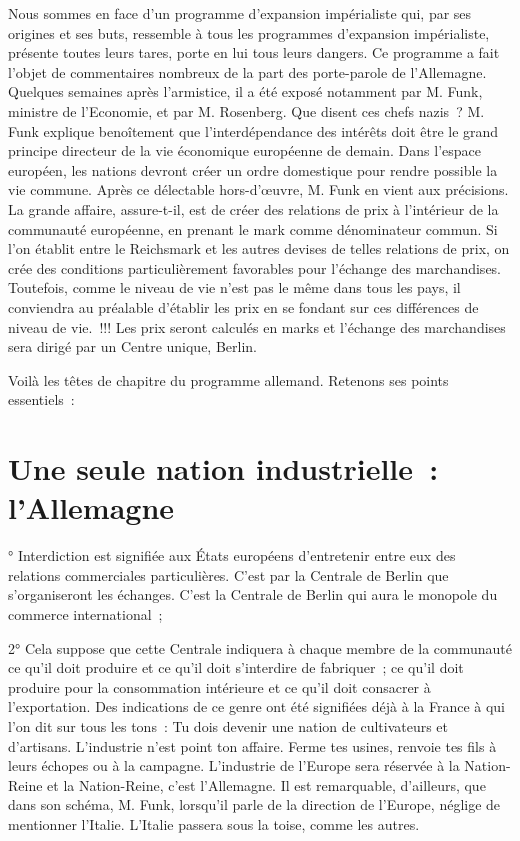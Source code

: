 \documentclass[french,twoside]{book} %
\begin{document}
Nous sommes en face d’un programme d’expansion impérialiste qui, par ses origines et ses buts, ressemble à tous les programmes d’expansion impérialiste, présente toutes leurs tares, porte en lui tous leurs dangers. Ce programme a fait l’objet de commentaires nombreux de la part des porte-parole de l’Allemagne. Quelques semaines après l’armistice, il a été exposé notamment par M. Funk, ministre de l’Economie, et par M. Rosenberg. Que disent ces chefs nazis ? M. Funk explique benoîtement que l’interdépendance des intérêts doit être le grand principe directeur de la vie économique européenne de demain. Dans l’espace européen, les nations devront créer un ordre domestique pour rendre possible la vie commune. Après ce délectable hors-d’œuvre, M. Funk en vient aux précisions. La grande affaire, assure-t-il, est de créer des relations de prix à l’intérieur de la communauté européenne, en prenant le mark comme dénominateur commun. Si l’on établit entre le Reichsmark et les autres devises de telles relations de prix, on crée des conditions particulièrement favorables pour l’échange des marchandises. Toutefois, comme le niveau de vie n’est pas le même dans tous les pays, il conviendra au préalable d’établir les prix en se fondant sur ces différences de niveau de vie. !!! Les prix seront calculés en marks et l’échange des marchandises sera dirigé par un Centre unique, Berlin.\par
Voilà les têtes de chapitre du programme allemand. Retenons ses points essentiels :
\section[Une seule nation industrielle : l’Allemagne]{Une seule nation industrielle : l’Allemagne}
° Interdiction est signifiée aux États européens d’entretenir entre eux des relations commerciales particulières. C’est par la Centrale de Berlin que s’organiseront les échanges. C’est la Centrale de Berlin qui aura le monopole du commerce international ;\par
2° Cela suppose que cette Centrale indiquera à chaque membre de la communauté ce qu’il doit produire et ce qu’il doit s’interdire de fabriquer ; ce qu’il doit produire pour la consommation intérieure et ce qu’il doit consacrer à l’exportation. Des indications de ce genre ont été signifiées déjà à la France à qui l’on dit sur tous les tons : Tu dois devenir une nation de cultivateurs et d’artisans. L’industrie n’est point ton affaire. Ferme tes usines, renvoie tes fils à leurs échopes ou à la campagne. L’industrie de l’Europe sera réservée à la Nation-Reine et la Nation-Reine, c’est l’Allemagne. Il est remarquable, d’ailleurs, que dans son schéma, M. Funk, lorsqu’il parle de la direction de l’Europe, néglige de mentionner l’Italie. L’Italie passera sous la toise, comme les autres.
\end{document}
